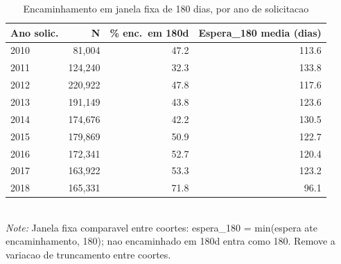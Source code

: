 \begin{table}[htbp]\centering
\caption{Encaminhamento em janela fixa de 180 dias, por ano de solicitacao}
\label{tab:R2a_janela180}
\small
\begin{tabular}{lrrr}
\toprule
Ano solic. & N & \% enc.\ em 180d & Espera\_180 media (dias) \\
\midrule
2010 & 81,004 & 47.2 & 113.6 \\
2011 & 124,240 & 32.3 & 133.8 \\
2012 & 220,922 & 47.8 & 117.6 \\
2013 & 191,149 & 43.8 & 123.6 \\
2014 & 174,676 & 42.2 & 130.5 \\
2015 & 179,869 & 50.9 & 122.7 \\
2016 & 172,341 & 52.7 & 120.4 \\
2017 & 163,922 & 53.3 & 123.2 \\
2018 & 165,331 & 71.8 & 96.1 \\
\bottomrule
\end{tabular}
\\[3pt]{\footnotesize \textit{Note:} Janela fixa comparavel entre coortes: espera\_180 = min(espera ate encaminhamento, 180); nao encaminhado em 180d entra como 180. Remove a variacao de truncamento entre coortes.}
\end{table}
